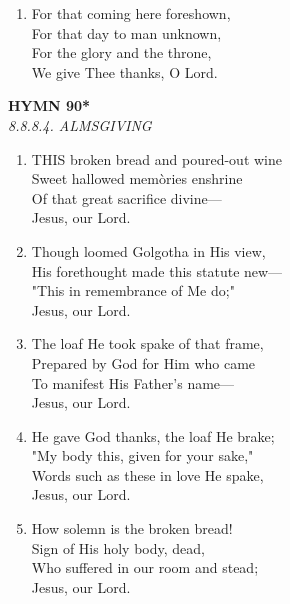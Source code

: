 \documentclass[11pt,a4paper]{article}
\begin{document}
\begin{enumerate}
    \item For that coming here foreshown, \\
        For that day to man unknown, \\
        For the glory and the throne, \\
        We give Thee thanks, O Lord.

\end{enumerate}

\newpage
\begin{center}
    {\Large \textbf{HYMN 90*\textdagger{}}}
    \\
    \textit{8.8.8.4. ALMSGIVING}
\end{center}
\vspace{1em}

\begin{enumerate}
    \item THIS broken bread and poured-out wine \\
        Sweet hallowed mem\`ories enshrine \\
        Of that great sacrifice divine--- \\
        Jesus, our Lord.

    \item Though loomed Golgotha in His view, \\
        His forethought made this statute new--- \\
        "This in remembrance of Me do;" \\
        Jesus, our Lord.

    \item The loaf He took spake of that frame, \\
        Prepared by God for Him who came \\
        To manifest His Father's name--- \\
        Jesus, our Lord.

    \item He gave God thanks, the loaf He brake; \\
        "My body this, given for your sake," \\
        Words such as these in love He spake, \\
        Jesus, our Lord.

    \item How solemn is the broken bread! \\
        Sign of His holy body, dead, \\
        Who suffered in our room and stead; \\
        Jesus, our Lord.


\end{enumerate}
\end{document}
